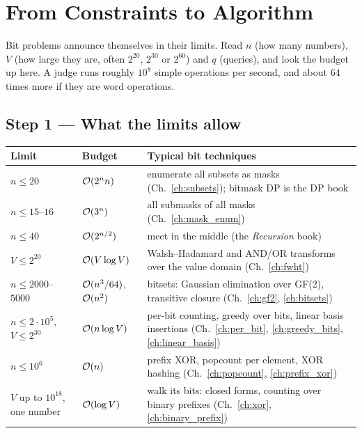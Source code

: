 \chapter{From Constraints to Algorithm}
\label{ch:constraints}

Bit problems announce themselves in their limits. Read $n$ (how many numbers), $V$ (how large they are, often $2^{20}$, $2^{30}$ or $2^{60}$) and $q$ (queries), and look the budget up here. A judge runs roughly $10^8$ simple operations per second, and about $64$ times more if they are word operations.

\section*{Step 1 --- What the limits allow}

\begingroup\small\renewcommand{\arraystretch}{1.3}
\begin{tabularx}{\linewidth}{@{}l l X@{}}
\toprule
\textbf{Limit} & \textbf{Budget} & \textbf{Typical bit techniques} \\
\midrule
$n \le 20$ & $\mathcal{O}(2^n n)$ & enumerate all subsets as masks (Ch.~\ref{ch:subsets}); bitmask DP is the DP book \\
$n \le 15$--$16$ & $\mathcal{O}(3^n)$ & all submasks of all masks (Ch.~\ref{ch:mask_enum}) \\
$n \le 40$ & $\mathcal{O}(2^{n/2})$ & meet in the middle (the \textit{Recursion} book) \\
$V \le 2^{20}$ & $\mathcal{O}(V \log V)$ & Walsh--Hadamard and AND/OR transforms over the value domain (Ch.~\ref{ch:fwht}) \\
$n \le 2000$--$5000$ & $\mathcal{O}(n^3/64)$, $\mathcal{O}(n^2)$ & bitsets: Gaussian elimination over GF(2), transitive closure (Ch.~\ref{ch:gf2}, \ref{ch:bitsets}) \\
$n \le 2\cdot10^5$, $V \le 2^{30}$ & $\mathcal{O}(n \log V)$ & per-bit counting, greedy over bits, linear basis insertions (Ch.~\ref{ch:per_bit}, \ref{ch:greedy_bits}, \ref{ch:linear_basis}) \\
$n \le 10^6$ & $\mathcal{O}(n)$ & prefix XOR, popcount per element, XOR hashing (Ch.~\ref{ch:popcount}, \ref{ch:prefix_xor}) \\
$V$ up to $10^{18}$, one number & $\mathcal{O}(\log V)$ & walk its bits: closed forms, counting over binary prefixes (Ch.~\ref{ch:xor}, \ref{ch:binary_prefix}) \\
\bottomrule
\end{tabularx}
\endgroup

